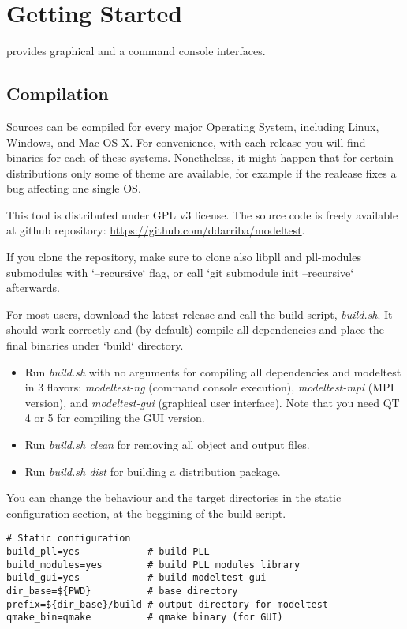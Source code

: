\section{Getting Started}

\modeltest provides graphical and a command console interfaces.

\subsection{Compilation}

Sources can be compiled for every major Operating System, including Linux, Windows, and Mac OS X. For convenience, with each release you will find binaries for each of these systems.
Nonetheless, it might happen that for certain distributions only some of theme are available, for example if the realease fixes a bug affecting one single OS.

This tool is distributed under GPL v3 license. 
The source code is freely available at github repository: \url{https://github.com/ddarriba/modeltest}.

If you clone the repository, make sure to clone also libpll and pll-modules submodules with `--recursive` flag, or call `git submodule init --recursive` afterwards.

For most users, download the latest release and call the build script, {\em build.sh}. 
It should work correctly and (by default) compile all dependencies and place the final binaries under `build` directory.

\begin{itemize}
\item Run {\em build.sh} with no arguments for compiling all dependencies and modeltest in 3 flavors: {\em modeltest-ng} (command console execution), {\em modeltest-mpi} (MPI version), and {\em modeltest-gui} (graphical user interface). Note that you need QT 4 or 5 for compiling the GUI version.
\item Run {\em build.sh clean} for removing all object and output files.
\item Run {\em build.sh dist} for building a distribution package.
\end{itemize}

You can change the behaviour and the target directories in the static configuration section, at the beggining of the build script.

\begin{lstlisting}
# Static configuration                                                          
build_pll=yes            # build PLL                                            
build_modules=yes        # build PLL modules library                            
build_gui=yes            # build modeltest-gui                                  
dir_base=${PWD}          # base directory                                       
prefix=${dir_base}/build # output directory for modeltest                       
qmake_bin=qmake          # qmake binary (for GUI)
\end{lstlisting}

